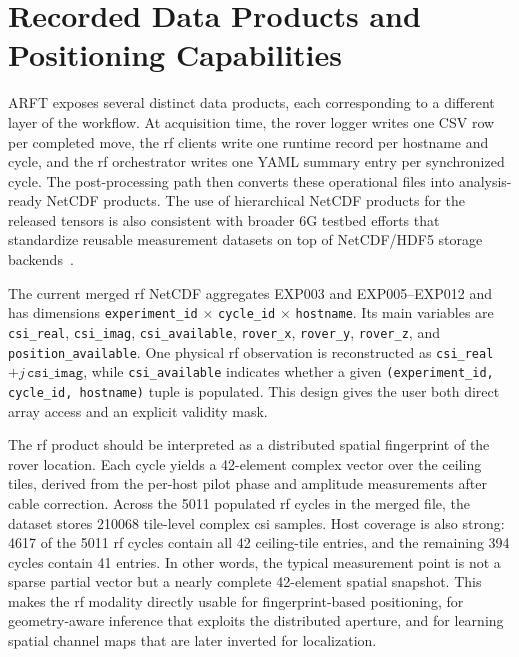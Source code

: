 \section{Recorded Data Products and Positioning Capabilities}
\label{sec:capabilities}

ARFT exposes several distinct data products, each corresponding to a different layer of the workflow. At acquisition time, the rover logger writes one CSV row per completed move, the \gls{rf} clients write one runtime record per hostname and cycle, and the \gls{rf} orchestrator writes one YAML summary entry per synchronized cycle. The post-processing path then converts these operational files into analysis-ready NetCDF products. The use of hierarchical NetCDF products for the released tensors is also consistent with broader 6G testbed efforts that standardize reusable measurement datasets on top of NetCDF/HDF5 storage backends~\cite{dss6g}.

The current merged \gls{rf} NetCDF aggregates EXP003 and EXP005--EXP012 and has dimensions \texttt{experiment\_id} $\times$ \texttt{cycle\_id} $\times$ \texttt{hostname}. Its main variables are \texttt{csi\_real}, \texttt{csi\_imag}, \texttt{csi\_available}, \texttt{rover\_x}, \texttt{rover\_y}, \texttt{rover\_z}, and \texttt{position\_available}. One physical \gls{rf} observation is reconstructed as \texttt{csi\_real} $+ j\,\texttt{csi\_imag}$, while \texttt{csi\_available} indicates whether a given \texttt{(experiment\_id, cycle\_id, hostname)} tuple is populated. This design gives the user both direct array access and an explicit validity mask.

The \gls{rf} product should be interpreted as a distributed spatial fingerprint of the rover location. Each cycle yields a 42-element complex vector over the ceiling tiles, derived from the per-host pilot phase and amplitude measurements after cable correction. Across the 5011 populated \gls{rf} cycles in the merged file, the dataset stores 210068 tile-level complex \gls{csi} samples. Host coverage is also strong: 4617 of the 5011 \gls{rf} cycles contain all 42 ceiling-tile entries, and the remaining 394 cycles contain 41 entries. In other words, the typical measurement point is not a sparse partial vector but a nearly complete 42-element spatial snapshot. This makes the \gls{rf} modality directly usable for fingerprint-based positioning, for geometry-aware inference that exploits the distributed aperture, and for learning spatial channel maps that are later inverted for localization.

